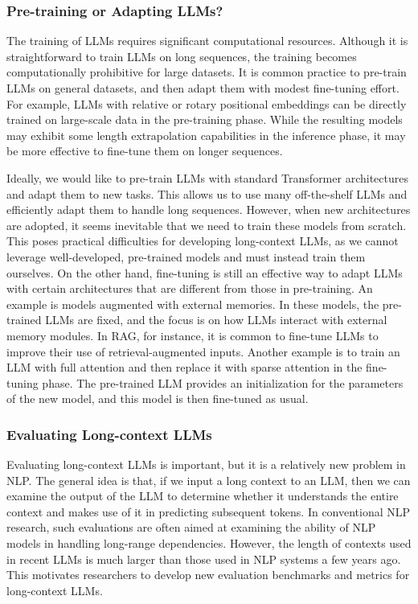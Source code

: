 \subsubsection{Pre-training or Adapting LLMs?}

The training of LLMs requires significant computational resources. Although it is straightforward to train LLMs on long sequences, the training becomes computationally prohibitive for large datasets. It is common practice to pre-train LLMs on general datasets, and then adapt them with modest fine-tuning effort. For example, LLMs with relative or rotary positional embeddings can be directly trained on large-scale data in the pre-training phase. While the resulting models may exhibit some length extrapolation capabilities in the inference phase, it may be more effective to fine-tune them on longer sequences.

Ideally, we would like to pre-train LLMs with standard Transformer architectures and adapt them to new tasks. This allows us to use many off-the-shelf LLMs and efficiently adapt them to handle long sequences. However, when new architectures are adopted, it seems inevitable that we need to train these models from scratch. This poses practical difficulties for developing long-context LLMs, as we cannot leverage well-developed, pre-trained models and must instead train them ourselves. On the other hand, fine-tuning is still an effective way to adapt LLMs with certain architectures that are different from those in pre-training. An example is models augmented with external memories. In these models, the pre-trained LLMs are fixed, and the focus is on how LLMs interact with external memory modules. In RAG, for instance, it is common to fine-tune LLMs to improve their use of retrieval-augmented inputs. Another example is to train an LLM with full attention and then replace it with sparse attention in the fine-tuning phase. The pre-trained LLM provides an initialization for the parameters of the new model, and this model is then fine-tuned as usual.

\subsubsection{Evaluating Long-context LLMs}

\noindent Evaluating long-context LLMs is important, but it is a relatively new problem in NLP. The general idea is that, if we input a long context to an LLM, then we can examine the output of the LLM to determine whether it understands the entire context and makes use of it in predicting subsequent tokens. In conventional NLP research, such evaluations are often aimed at examining the ability of NLP models in handling long-range dependencies. However, the length of contexts used in recent LLMs is much larger than those used in NLP systems a few years ago. This motivates researchers to develop new evaluation benchmarks and metrics for long-context LLMs.

